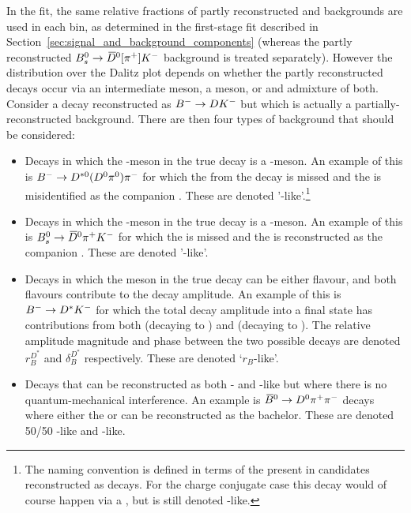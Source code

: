 In the \CP fit, the same relative fractions of partly reconstructed \Bpm and \Bz backgrounds are used in each bin, as determined in the first-stage fit described in Section~\ref{sec:signal_and_background_components} (whereas the partly reconstructed ${{B}^0_{s}}\rightarrow{\ensuremath{{\kern 0.18em\overline{\kern -0.18em D}}{}^0}}[\pi^+]K^-$ background is treated separately). However the distribution over the Dalitz plot depends on whether the partly reconstructed decays occur via an intermediate \Dz meson, a \Dzb meson, or and admixture of both. Consider a decay reconstructed as ${{{B}^-}}\rightarrow{\ensuremath{D}}{\ensuremath{{K}^-}}$ but which is actually a partially-reconstructed background. There are then four types of background that should be considered:
\begin{itemize}
\item Decays in which the \PD-meson in the true decay is a \Dz-meson. An example of this is ${{{B}^-}}\rightarrow{\ensuremath{{D}^{*0}}}({{D}^0}{{\pi}^0}){{\pi}^-}$ for which the \piz from the \Dstarz decay is missed and the \pim is misidentified as the companion \Km. These are denoted '\Dz-like'.\footnote{The naming convention is defined in terms of the \D present in candidates reconstructed as \Bm decays. For the charge conjugate case this decay would of course happen via a \Dzb, but is still denoted \Dz-like.}

\item Decays in which the \PD-meson in the true decay is a \Dzb-meson. An example of this is ${{B}^0_{s}}\rightarrow{\ensuremath{{\kern 0.18em\overline{\kern -0.18em D}}{}^0}}{\ensuremath{{\pi}^+}}{\ensuremath{{K}^-}}$ for which the \pip is missed and the \Km is reconstructed as the companion \Km. These are denoted '\Dzb-like'.

\item Decays in which the \PD meson in the true decay can be either flavour, and both \D flavours contribute to the decay amplitude. An example of this is ${{{B}^-}}\rightarrow{\ensuremath{{D}^*}}{\ensuremath{{K}^-}}$ for which the total decay amplitude into a \D final state has contributions from both \Dstarz (decaying to \Dz) and \Dstarzb (decaying to \Dzb). The relative amplitude magnitude and phase between the two possible \PB decays are denoted $r_{B}^{D^*}$ and $\delta_{B}^{D^*}$ respectively. These are denoted  `$r_B$-like'. %

\item Decays that can be reconstructed as both \Dz- and \Dzb-like but where there is no quantum-mechanical interference. An example is ${{\kern 0.18em\overline{\kern -0.18em B}}{}^0}\rightarrow{\ensuremath{{D}^0}}{\ensuremath{{\pi}^+}}{\ensuremath{{\pi}^-}}$ decays where either the \pip or \pim can be reconstructed as the bachelor. These are denoted 50/50 \Dz-like and \Dzb-like. 

\end{itemize}
